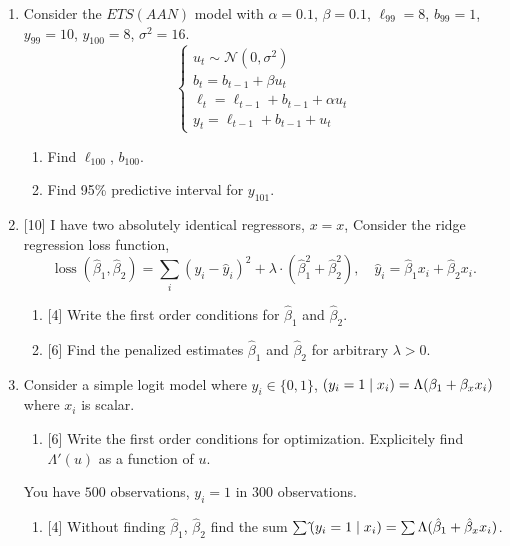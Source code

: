 \documentclass[12pt]{article}
\DeclareMathOperator{\loss}{loss}
\let\P\relax
\DeclareMathOperator{\P}{\mathbb{P}}
\newcommand \cN{\mathcal{N}}
\newcommand{\hb}{\hat{\beta}}
\begin{document}

\begin{enumerate}
    \item Consider the $ETS(AAN)$ model with $\alpha = 0.1$, $\beta=0.1$, $\ell_{99}=8$, $b_{99}=1$, $y_{99}=10$, $y_{100}=8$, $\sigma^2=16$.
    \[
      \begin{cases}
            u_t \sim \cN (0, \sigma^2) \\
            b_t = b_{t-1} + \beta u_t \\
            \ell_t = \ell_{t-1} + b_{t-1} + \alpha u_t \\
            y_t = \ell_{t-1} + b_{t-1} + u_t
      \end{cases}
    \]    
     \begin{enumerate}
      \item Find $\ell_{100}$, $b_{100}$.
      \item Find 95\% predictive interval for $y_{101}$.
    \end{enumerate}

    \item {[10]} I have two absolutely identical regressors, $x = x$, 
    Consider the ridge regression loss function,  
    \[
    \loss(\hb_1, \hb_2) = \sum_i (y_i - \hat y_i)^2 + \lambda \cdot (\hb_1^2 + \hb_2^2), \quad \hat y_i = \hb_1 x_i + \hb_2 x_i.
    \] 
    \begin{enumerate}
        \item {[4]} Write the first order conditions for $\hb_1$ and $\hb_2$.
        \item {[6]} Find the penalized estimates $\hb_1$ and $\hb_2$ for arbitrary $\lambda > 0$.
    \end{enumerate}


    \item Consider a simple logit model where $y_i \in \{0, 1\}$, $\P(y_i = 1 \mid x_i) = \Lambda(\beta_1 + \beta_x x_i)$ where $x_i$ is scalar. 
    
    \begin{enumerate}
        \item {[6]} Write the first order conditions for optimization. 
        Explicitely find $\Lambda'(u)$ as a function of $u$.
    \end{enumerate}
    You have $500$ observations, $y_i = 1$ in $300$ observations. 
    \begin{enumerate}[resume]
        \item {[4]} Without finding $\hb_1$, $\hb_2$ find the sum $\sum \hat{\P}(y_i = 1 \mid x_i) = \sum \Lambda(\hb_1 + \hb_x x_i)$.
    \end{enumerate}  


\end{enumerate}
\end{document}
